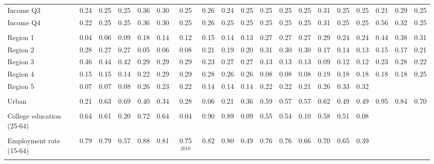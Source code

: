\begin{tabular}{l*{18}{c}}
Income Q3 & 0.24 & 0.25 & 0.25 & 0.36 & 0.30 & 0.25 & 0.26 & 0.24 & 0.25 & 0.25 & 0.25 & 0.25 & 0.31 & 0.25 & 0.25 & 0.21 & 0.29 & 0.25 \\
Income Q4 & 0.22 & 0.25 & 0.25 & 0.36 & 0.30 & 0.25 & 0.26 & 0.25 & 0.25 & 0.25 & 0.25 & 0.25 & 0.31 & 0.25 & 0.25 & 0.56 & 0.32 & 0.25 \\
\\
Region 1 & 0.04 & 0.06 & 0.09 & 0.18 & 0.14 & 0.12 & 0.15 & 0.14 & 0.13 & 0.27 & 0.27 & 0.27 & 0.29 & 0.24 & 0.24 & 0.44 & 0.38 & 0.31 \\
Region 2 & 0.28 & 0.27 & 0.27 & 0.05 & 0.06 & 0.08 & 0.21 & 0.19 & 0.20 & 0.31 & 0.30 & 0.30 & 0.17 & 0.14 & 0.13 & 0.15 & 0.17 & 0.21 \\
Region 3 & 0.46 & 0.44 & 0.42 & 0.29 & 0.29 & 0.29 & 0.23 & 0.27 & 0.27 & 0.13 & 0.13 & 0.13 & 0.09 & 0.12 & 0.12 & 0.23 & 0.28 & 0.22 \\
Region 4 & 0.15 & 0.15 & 0.14 & 0.22 & 0.29 & 0.29 & 0.28 & 0.26 & 0.26 & 0.08 & 0.08 & 0.08 & 0.19 & 0.18 & 0.18 & 0.18 & 0.18 & 0.25 \\
Region 5 & 0.07 & 0.07 & 0.08 & 0.26 & 0.23 & 0.22 & 0.14 & 0.14 & 0.14 & 0.22 & 0.22 & 0.21 & 0.26 & 0.33 & 0.32 & & & \\
\\
Urban & 0.21 & 0.63 & 0.69 & 0.40 & 0.34 & 0.28 & 0.06 & 0.21 & 0.36 & 0.59 & 0.57 & 0.57 & 0.62 & 0.49 & 0.49 & 0.95 & 0.84 & 0.70 \\
\\
College education (25-64) & 0.64 & 0.61 & 0.20 & 0.72 & 0.64 & 0.04 & 0.90 & 0.89 & 0.09 & 0.55 & 0.54 & 0.10 & 0.58 & 0.51 & 0.08 & & & \\
\\
Employment rate (15-64) & 0.79 & 0.79 & 0.57 & 0.88 & 0.81 & 0.75$^\text{2010}$ & 0.82 & 0.80 & 0.49 & 0.76 & 0.76 & 0.66 & 0.70 & 0.65 & 0.39 & & & \\
\\
\bottomrule
\end{tabular}